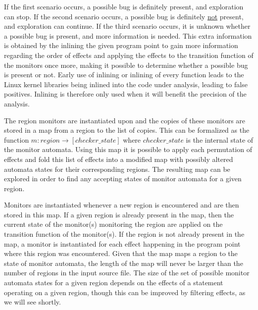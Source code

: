 \newpar If the first scenario occurs, a possible bug is definitely present, and exploration can stop. If the second scenario occurs, a possible bug is definitely \underline{not} present, and exploration can continue. If the third scenario occurs, it is unknown whether a possible bug is present, and more information is needed. This extra information is obtained by the inlining the given program point to gain more information regarding the order of effects and applying the effects to the transition function of the monitors once more, making it possible to determine whether a possible bug is present or not. Early use of inlining or inlining of every function leads to the Linux kernel libraries being inlined into the code under analysis, leading to false positives. Inlining is therefore only used when it will benefit the precision of the analysis. 

\newpar The region monitors are instantiated upon and the copies of these monitors are stored in a map from a region to the list of copies. This can be formalized as the function $m: region \rightarrow { [checker\_state] }$ where $ checker\_state $ is the internal state of the monitor automata. Using this map it is possible to apply each permutation of effects and fold this list of effects into a modified map with possibly altered automata states for their corresponding regions. The resulting map can be explored in order to find any accepting states of monitor automata for a given region. 

\newpar Monitors are instantiated whenever a new region is encountered and are then stored in this map. If a given region is already present in the map, then the current state of the monitor(s) monitoring the region are applied on the transition function of the monitor(s). If the region is not already present in the map, a monitor is instantiated for each effect happening in the program point where this region was encountered. Given that the map maps a region to the state of monitor automata, the length of the map will never be larger than the number of regions in the input source file. The size of the set of possible monitor automata states for a given region depends on the effects of a statement operating on a given region, though this can be improved by filtering effects, as we will see shortly. 


